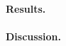 \lipsum[18][1-3]

\paragraph{Results.}

\lipsum[19][1-5]

\paragraph{Discussion.}

\lipsum[20][1-4]
